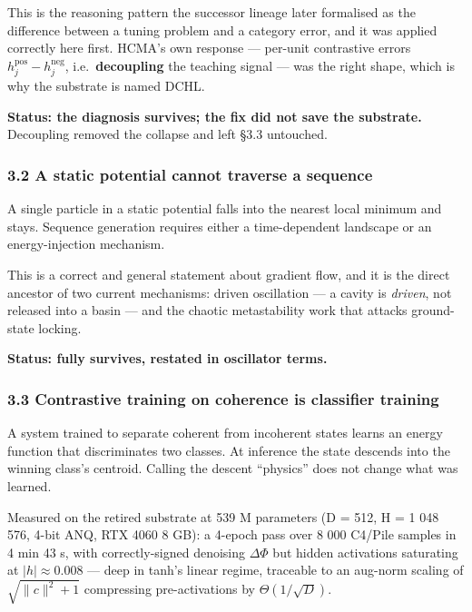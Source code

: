 \documentclass[
  11pt,
  a4paper,
]{article}
\begin{document}
This is the reasoning pattern the successor lineage later formalised as
the difference between a tuning problem and a category error, and it was
applied correctly here first. HCMA's own response --- per-unit
contrastive errors \(h^{\text{pos}}_j - h^{\text{neg}}_j\),
i.e.~\textbf{decoupling} the teaching signal --- was the right shape,
which is why the substrate is named DCHL.

\textbf{Status: the diagnosis survives; the fix did not save the
substrate.} Decoupling removed the collapse and left §3.3 untouched.

\subsubsection{3.2 A static potential cannot traverse a
sequence}\label{a-static-potential-cannot-traverse-a-sequence}

A single particle in a static potential falls into the nearest local
minimum and stays. Sequence generation requires either a time-dependent
landscape or an energy-injection mechanism.

This is a correct and general statement about gradient flow, and it is
the direct ancestor of two current mechanisms: driven oscillation --- a
cavity is \emph{driven}, not released into a basin --- and the chaotic
metastability work that attacks ground-state locking.

\textbf{Status: fully survives, restated in oscillator terms.}

\subsubsection{3.3 Contrastive training on coherence is classifier
training}\label{contrastive-training-on-coherence-is-classifier-training}

A system trained to separate coherent from incoherent states learns an
energy function that discriminates two classes. At inference the state
descends into the winning class's centroid. Calling the descent
``physics'' does not change what was learned.

Measured on the retired substrate at 539 M parameters (D = 512, H = 1
048 576, 4-bit ANQ, RTX 4060 8 GB): a 4-epoch pass over 8 000 C4/Pile
samples in 4 min 43 s, with correctly-signed denoising \(\Delta\Phi\)
but hidden activations saturating at \(|h| \approx 0.008\) --- deep in
tanh's linear regime, traceable to an aug-norm scaling of
\(\sqrt{\lVert c \rVert^2 + 1}\) compressing pre-activations by
\(\Theta(1/\sqrt{D})\).
\end{document}
